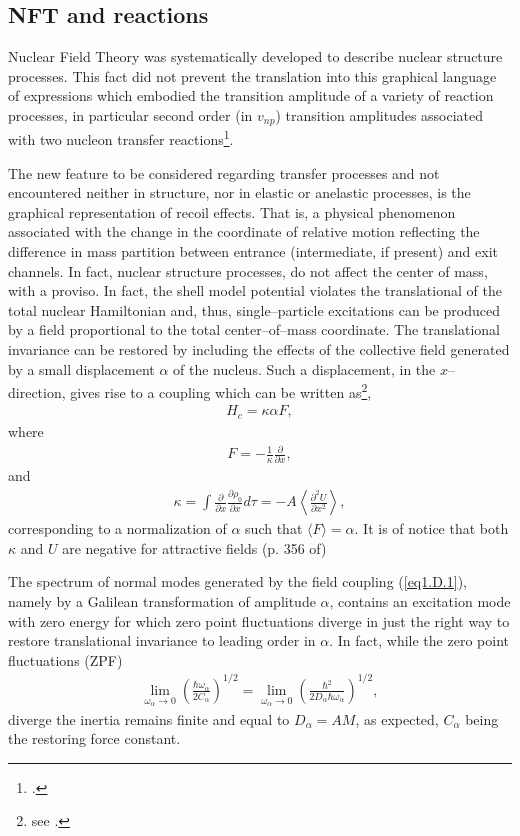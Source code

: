 \begin{subappendices}
\section{NFT and reactions}\label{App1.D}
Nuclear Field Theory was systematically developed to describe nuclear structure processes. This fact did not prevent the translation into this graphical language of expressions which embodied the transition amplitude of a variety of reaction processes, in particular second order (in $v_{np}$) transition amplitudes associated with two nucleon transfer reactions\footnote{\cite{Broglia:75}.}.


The new feature to be considered regarding transfer processes and not encountered neither in structure, nor in elastic or anelastic processes, is the graphical representation of recoil effects. That is, a physical phenomenon associated with the change in the coordinate of relative motion reflecting the difference in mass partition between entrance (intermediate, if present) and exit channels. In fact, nuclear structure processes, do not affect the center of mass, with a proviso. In fact, the shell model potential violates the translational of the total nuclear Hamiltonian and, thus, single--particle excitations can be produced by a field proportional to the total center--of--mass coordinate. The translational invariance can be restored by including  the effects of the collective field generated by a small displacement $\alpha$ of the nucleus. Such a displacement, in the $x$--direction, gives rise to a coupling which can be written as\footnote{\label{foot63}see \cite{Bohr:75}.},
\begin{align}\label{eq1.D.1}
H_{c}=\kappa\alpha F,
\end{align}
where 
\begin{align}\label{eq1.D.2}
F=-\frac{1}{\kappa}\frac{\partial}{\partial x},
\end{align}
and
\begin{align}\label{eq1.D.3}
\kappa=\int\frac{\partial}{\partial x}\frac{\partial \rho_0}{\partial x}d\tau=-A\left\langle\frac{\partial^2U}{\partial x^2}\right\rangle,
\end{align}
corresponding to a normalization of $\alpha$ such that $\langle F\rangle=\alpha$. It is of notice that both $\kappa$ and $U$ are negative for attractive fields (p. 356 of\footnotemark[\ref{foot63}])


The spectrum  of normal modes generated by the field coupling (\ref{eq1.D.1}), namely by a Galilean transformation of amplitude $\alpha$, contains an excitation mode with zero energy for which zero point fluctuations diverge in just the right way to restore translational invariance to leading order in $\alpha$. In fact, while the zero point fluctuations (ZPF)
\begin{align}\label{eq1.D.4}
\lim_{\omega_\alpha\to 0}\left(\frac{\hbar\omega_\alpha}{2C_\alpha}\right)^{1/2}=\lim_{\omega_\alpha\rightarrow 0}\left(\frac{\hbar^2}{2D_\alpha\hbar\omega_\alpha}\right)^{1/2},
\end{align}
diverge the inertia remains finite and equal to $D_\alpha=AM$, as expected, $C_\alpha$ being the restoring force constant.



\end{subappendices}
